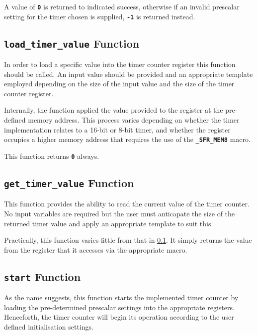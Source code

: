 \documentclass[a4paper, oneside, 11pt, titlepage, onecolumn, openright]{report}
\begin{document}
			A value of \textbf{\texttt{0}} is returned to indicated success, otherwise if an invalid prescalar setting for the timer chosen is supplied, \textbf{\texttt{-1}} is returned instead.
			
\subsection{\textbf{\texttt{load\_timer\_value}} Function}
			\label{ss:HALtcload_timer_valueFunction}
			
			In order to load a specific value into the timer counter register this function should be called. An input value should be provided and an appropriate template employed depending on the size of the input value and the size of the timer counter register.
			
			Internally, the function applied the value provided to the register at the pre-defined memory address. This process varies depending on whether the timer implementation relates to a 16-bit or 8-bit timer, and whether the register occupies a higher memory address that requires the use of the \textbf{\texttt{\_SFR\_MEM8}} macro.
			
			This function returns \textbf{\texttt{0}} always.
			
\subsection{\textbf{\texttt{get\_timer\_value}} Function}
			\label{ss:HALtcget_timer_valueFunction}
			
			This function provides the ability to read the current value of the timer counter. No input variables are required but the user must anticapate the size of the returned timer value and apply an appropriate template to suit this.
			
			Practically, this function varies little from that in \ref{ss:HALtcload_timer_valueFunction}. It simply returns the value from the register that it accesses via the appropriate macro.
			
\subsection{\textbf{\texttt{start}} Function}
			\label{ss:HALtcstartFunction}
			
			As the name suggests, this function starts the implemented timer counter by loading the pre-determined prescalar settings into the appropriate registers. Henceforth, the timer counter will begin its operation according to the user defined initialisation settings.
			
\end{document}
